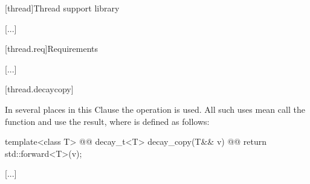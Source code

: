 
\setcounter{chapter}{30}
[thread]{Thread support library}

[...]

\setcounter{section}{1}
[thread.req]{Requirements}

[...]

\setcounter{subsection}{5}
[thread.decaycopy]{}

\pnum
In several places in this Clause the operation
%
%
{} is used. All
such uses mean call the function  and use the
result, where  is defined as follows:

\begin{codeblock}
template<class T>
  @@ decay_t<T> decay_copy(T&& v)
    @@
  { return std::forward<T>(v); }
\end{codeblock}

[...]
